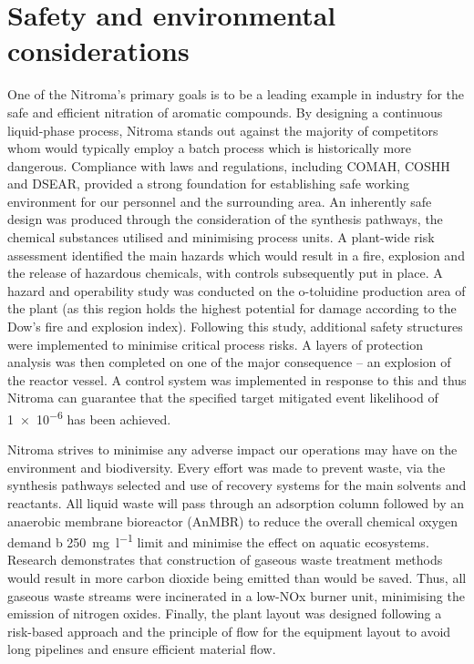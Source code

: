 \section*{Safety and environmental considerations}

 One of the Nitroma's primary goals is to be a leading example in industry for the safe and efficient nitration of aromatic compounds. By designing a continuous liquid-phase process, Nitroma stands out against the majority of competitors whom would typically employ a batch process which is historically more dangerous. Compliance with laws and regulations, including COMAH, COSHH and DSEAR, provided a strong foundation for establishing safe working environment for our personnel and the surrounding area. An inherently safe design was produced through the consideration of the synthesis pathways, the chemical substances utilised and minimising process units. A plant-wide risk assessment identified the main hazards which would result in a fire, explosion and the release of hazardous chemicals, with controls subsequently put in place. A hazard and operability study was conducted on the o-toluidine production area of the plant (as this region holds the highest potential for damage according to the Dow's fire and explosion index). Following this study, additional safety structures were implemented to minimise critical process risks. A layers of protection analysis was then completed on one of the major consequence – an explosion of the reactor vessel. A control system was implemented in response to this and thus Nitroma can guarantee that the specified target mitigated event likelihood of \num{1e-6} has been achieved.

Nitroma strives to minimise any adverse impact our operations may have on the environment and biodiversity. Every effort was made to prevent waste, via the synthesis pathways selected and use of recovery systems for the main solvents and reactants. All liquid waste will pass through an adsorption column followed by an anaerobic membrane bioreactor (AnMBR) to reduce the overall chemical oxygen demand b \SI{250}{\mg\per\litre} limit and minimise the effect on aquatic ecosystems. Research demonstrates that construction of gaseous waste treatment methods would result in more carbon dioxide being emitted than would be saved. Thus, all gaseous waste streams were incinerated in a low-NOx burner unit, minimising the emission of nitrogen oxides. Finally, the plant layout was designed following a risk-based approach and the principle of flow for the equipment layout to avoid long pipelines and ensure efficient material flow. 

